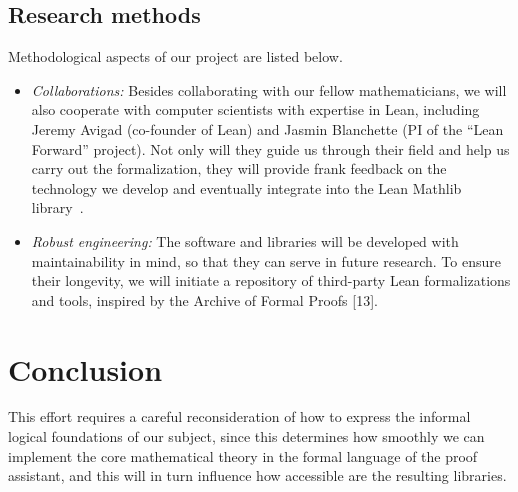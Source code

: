 \documentclass[11pt]{amsart}  %
\begin{document}

\subsection{Research methods} 
Methodological aspects of our project are listed below.
\begin{itemize}
\item \textsl{Collaborations:} Besides collaborating with our fellow mathematicians, we will also cooperate with computer scientists with expertise in Lean, including Jeremy Avigad (co-founder of Lean) and Jasmin Blanchette (PI of the ``Lean Forward'' project). Not only will they guide us through their field and help us carry out the formalization, they will provide frank feedback on the technology we develop and eventually integrate into the Lean Mathlib library~\cite{lean-mathlib:2018}. 
\item \textsl{Robust engineering:} The software and libraries will be developed with maintainability in mind, so that they can serve in future research. To ensure their longevity, we will initiate a repository of third-party Lean formalizations and tools, inspired by the Archive of Formal Proofs [13].
\end{itemize}




\section{Conclusion}
This effort requires a careful reconsideration of how to express the informal 
logical foundations of our subject, since this determines how smoothly 
we can implement the core mathematical theory in the formal language of the proof assistant,
and this will in turn influence how accessible are the resulting libraries.
\end{document}
